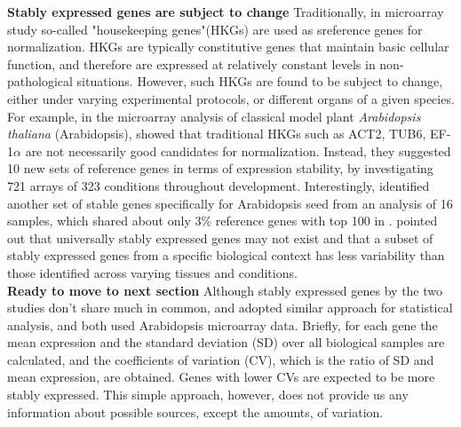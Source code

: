 \documentclass[11pt, a4paper]{article}
\begin{document}
\textbf{Stably expressed genes are subject to change}
Traditionally, in microarray study so-called "housekeeping genes"(HKGs) are used as sreference genes for normalization. HKGs are typically constitutive genes that maintain basic cellular function, and therefore are expressed at relatively constant levels in non-pathological situations. However, such HKGs are found to be subject to change, either under varying experimental protocols, or different organs of a given species. For example, in the microarray analysis of classical model plant \textit{Arabidopsis thaliana} (Arabidopsis), \cite{czechowski2005genome} showed that traditional HKGs such as ACT2, TUB6, EF-1$\alpha$ are not necessarily good candidates for normalization.  Instead, they suggested 10 new sets of reference genes in terms of expression stability,  by investigating 721 arrays of 323 conditions throughout development. Interestingly, \cite{dekkers2012identification} identified another set of stable genes specifically for Arabidopsis seed from an analysis of 16 samples, which shared about only 3\% reference genes with top 100 in \cite{czechowski2005genome}.  \cite{hruz2011refgenes} pointed out that universally stably expressed genes may not exist and that a subset of stably expressed genes from a specific biological context has less variability than those identified across varying tissues and conditions.\\

\textbf{Ready to move to next section}
Although stably expressed genes by the two studies don't share much in common, \cite{czechowski2005genome} and \cite{dekkers2012identification} adopted  similar approach for statistical analysis, and both used Arabidopsis microarray data. Briefly, for each gene the mean expression and the standard deviation (SD) over all biological samples are calculated, and the coefficients of variation (CV), which is the ratio of SD and mean expression, are obtained. Genes with lower CVs are expected to be more stably expressed. This simple approach, however, does not provide us any information about possible sources, except the amounts,  of variation.\\ 
\end{document}
